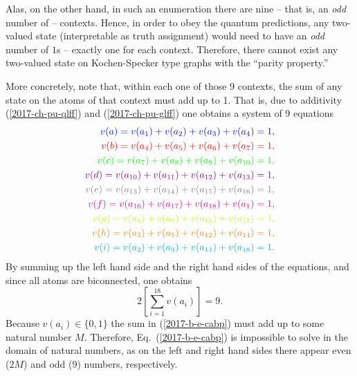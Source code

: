 \documentclass[%
  twocolumn,
 showpacs,
 showkeys,
 preprintnumbers,
 amsmath,amssymb,
 aps,
  pra,
  longbibliography,
 floatfix,
 ]{revtex4-1}
\begin{document}
Alas, on the other hand, in such an enumeration
there are nine  -- that is, an {\em odd} number of -- contexts.
Hence,
in order to obey the quantum predictions,
any  two-valued state (interpretable as truth assignment)
would need to have an {\em odd} number of $1$s -- exactly one for each context.
Therefore, there cannot exist any two-valued state on Kochen-Specker type graphs with the  ``parity property.''

More concretely,  note that, within each one of those 9 contexts,
the sum of any state on the atoms of that context must add up to 1.
That is, due to additivity (\ref{2017-ch-pu-qlff}) and (\ref{2017-ch-pu-glff})
one obtains a system of 9 equations
\begin{equation}
\begin{split}
\color{blue}        v(a)= v( a_1 ) + v( a_2 ) + v( a_3 ) + v( a_4 ) = 1 ,                  \\
\color{red}         v(b)= v( a_4 ) + v( a_5 ) + v( a_6 ) + v( a_7 ) = 1 ,                  \\
\color{green}       v(c)= v( a_7 ) + v( a_8 ) + v( a_9 ) + v( a_{10} ) = 1 ,               \\
\color{violet}      v(d)= v( a_{10} ) + v( a_{11} ) + v( a_{12} ) + v( a_{13} ) = 1 ,      \\
\color{gray}        v(e)= v( a_{13} ) + v( a_{14} ) + v( a_{15} ) + v( a_{16} ) = 1 ,      \\
\color{magenta}     v(f)= v( a_{16} ) + v( a_{17} ) + v( a_{18} ) + v( a_1 ) = 1 ,         \\
\color{lime}        v(g)= v( a_6 ) + v( a_8 ) + v( a_{15} ) + v( a_{17} ) = 1 ,            \\
\color{orange}      v(h)= v( a_3 ) + v( a_5 ) + v( a_{12} ) + v( a_{14} ) = 1 ,            \\
\color{cyan}        v(i)= v( a_2 ) + v( a_9 ) + v( a_{11} ) + v( a_{18} ) = 1 .
\label{2017-b-e-cabp-conf}
\end{split}
\end{equation}
By summing up the left hand side and the right hand sides of the equations, and since all atoms are biconnected,
one obtains
\begin{equation}
2 \left[\sum_{i=1}^{18} v(a_i)\right] = 9.
\label{2017-b-e-cabp}
\end{equation}
Because $v(a_i)\in \{0,1\}$ the sum in (\ref{2017-b-e-cabp}) must add up to some natural number $M$.
Therefore, Eq.~(\ref{2017-b-e-cabp}) is impossible to solve in the domain of natural numbers,
as on the left and right hand sides there appear even ($2M$) and odd ($9$) numbers, respectively.
\end{document}
